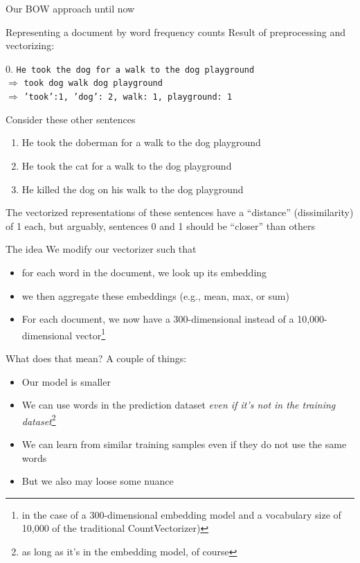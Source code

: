 \documentclass[compress]{beamer}
\begin{document}
\begin{frame}{Our BOW approach until now}
	\begin{block}{Representing a document by word frequency counts}
		Result of preprocessing and vectorizing:
		
		0. \texttt{He took the dog for a walk to the dog playground}\\
		$\Rightarrow$ \texttt{took dog walk dog playground}\\
		$\Rightarrow$ \texttt{'took':1, 'dog': 2, walk: 1, playground: 1}
	\end{block}
	
	Consider these other sentences
	\begin{enumerate}
		\item He took the doberman for a walk to the dog playground
		\item He took the cat for a walk to the dog playground
		\item He killed the dog on his walk to the dog playground 
	\end{enumerate}
	
	The vectorized representations of these sentences have a ``distance'' (dissimilarity) of 1 each, but arguably, sentences 0 and 1 should be ``closer'' than others
	
\end{frame}


\begin{frame}{The idea}
We modify our vectorizer such that
\begin{itemize}[<+->]
	\item for each word in the document, we look up its embedding
	\item we then aggregate these embeddings (e.g., mean, max, or sum)
	\item For each document, we now have a 300-dimensional instead of a 10,000-dimensional vector\footnote{in the case of a 300-dimensional embedding model and a vocabulary size of 10,000 of the traditional CountVectorizer)}
\end{itemize}

\end{frame}



\begin{frame}{What does that mean?}
A couple of things:
	\begin{itemize}[<+->]
		\item Our model is smaller
		\item We can use words in the prediction dataset \emph{even if it's not in the training dataset}\footnote{as long as it's in the embedding model, of course}
		\item We can learn from similar training samples even if they do not use the same words
		\item But we also may loose some nuance
		\end{itemize}
\end{frame}
	
\end{document}
